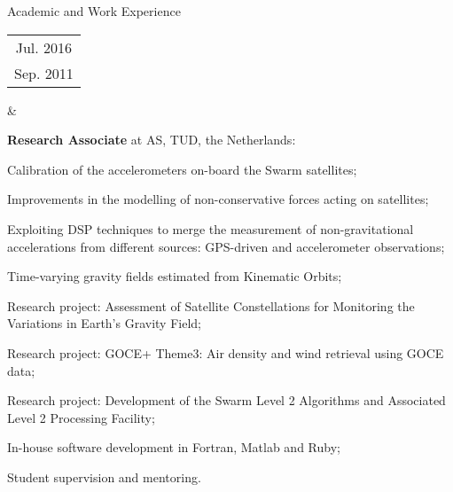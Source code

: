 \documentclass[a4paper,12pt]{article}
\begin{document}
\begin{cvsection}{Academic and Work Experience}
\begin{tabular}{c}
Jul. 2016 \\
Sep. 2011 \\ 
\end{tabular} 
&
  \begin{itti}
    \item \textbf{Research Associate} at \ac{AS}, \ac{TUD}, the Netherlands:
    \begin{ittib}
      \item Calibration of the accelerometers on-board the Swarm satellites;
      \item Improvements in the modelling of non-conservative forces acting on satellites;
      \item Exploiting \acf{DSP} techniques to merge the measurement of non-gravitational accelerations from different sources: \acf{GPS}-driven and accelerometer observations;
      \item Time-varying gravity fields estimated from Kinematic Orbits;
      \item Research project: Assessment of Satellite Constellations for Monitoring the Variations in Earth's Gravity Field;
      \item Research project: GOCE+ Theme3: Air density and wind retrieval using \acf{GOCE} data;
      \item Research project: Development of the Swarm Level 2 Algorithms and Associated Level 2 Processing Facility;
      \item In-house software development in Fortran, Matlab and Ruby;
      \item Student supervision and mentoring.
    \end{ittib}
  \end{itti}\\


\end{cvsection}
\end{document}
